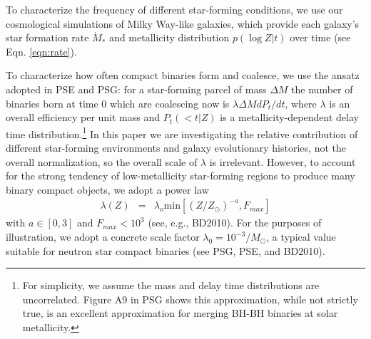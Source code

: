 \documentclass[a4paper,fleqn,usenatbib]{mnras}
\newcommand\abbrvPSgrb{PSG}
\newcommand\abbrvPSellipticals{PSE}
\newcommand\abbrvKBLowZa{BD2010}
\begin{document}

To characterize the frequency of different star-forming conditions, we use our cosmological simulations of Milky Way-like galaxies, which provide each galaxy's star formation rate
$\dot{M}_*$ and metallicity distribution $p(\log Z|t)$ over time (see Eqn. \ref{eqn:rate}).

To characterize how often compact binaries form and coalesce, we use the ansatz adopted in \abbrvPSellipticals{} and
\abbrvPSgrb{}: for a star-forming parcel of mass $\Delta M$ the number of binaries born at time $0$ which
are coalescing now is $\lambda \Delta M dP_t/dt$, where $\lambda$ is an overall efficiency per unit mass and $P_t(<t|Z)$ is
a metallicity-dependent delay time distribution.\footnote{For simplicity, we assume the mass and delay time
  distributions are uncorrelated.  Figure A9 in \abbrvPSgrb{} shows this approximation, while not strictly true, is an
  excellent approximation for merging BH-BH binaries at solar metallicity.  }
    In this paper we are investigating the relative contribution of
different star-forming environments and galaxy evolutionary histories, not the overall normalization, so the overall scale of $\lambda$ is irrelevant.  
However, to account for the strong tendency of low-metallicity star-forming regions to produce many binary compact
objects, we adopt a power law
\begin{eqnarray}
\label{eq:LambdaVersusZModel}
\lambda(Z) &=& \lambda_o \text{min}[(Z/Z_\odot)^{-a}, F_{max}] 
\end{eqnarray}
with $a\in [0,3]$ and $F_{max}<10^3$
 (see, e.g.\cite{popsyn-LIGO-SFR-2008}, \abbrvKBLowZa).  For the purposes of illustration, we adopt a  concrete scale
factor  $\lambda_0 = 10^{-3}/M_\odot $,  a typical value suitable for neutron star compact binaries (see \abbrvPSgrb{},
\abbrvPSellipticals, and \abbrvKBLowZa).
\end{document}
